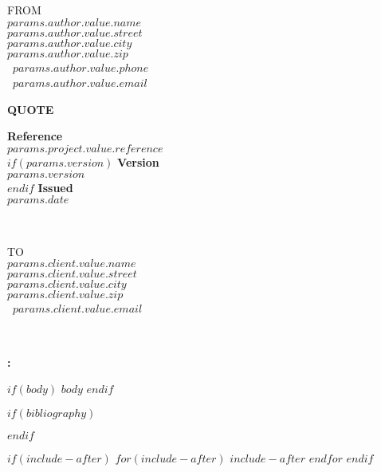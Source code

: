 \documentclass[
11pt,
a4paper,
twoside,
]{article}
\begin{document}
\vspace{0pt}
\begin{minipage}[t]{0.5\textwidth}
  \vspace{0pt}
  \begin{flushleft}
    \uppercase{From}                      \\
    \textbf{$params.author.value.name$}   \\
    $params.author.value.street$          \\
    $params.author.value.city$            \\
    $params.author.value.zip$             \\
    \faPhone\ $params.author.value.phone$ \\
    \faEnvelopeO\ $params.author.value.email$
  \end{flushleft}
\end{minipage}
\hfill
\begin{minipage}[t]{0.5\textwidth}
  \vspace{0pt}
  \begin{flushright}
    {\LARGE\bfseries\uppercase{Quote}}

    {\bfseries Reference}               \\
    $params.project.value.reference$ \\
    $if(params.version)$
    {\bfseries Version}                 \\
    $params.version$              \\
    $endif$
    {\bfseries Issued}                    \\
    $params.date$
  \end{flushright}
\end{minipage}\\[\baselineskip]
\begin{minipage}{1\textwidth}
  \begin{flushleft}
    \uppercase{To}\\
    \textbf{$params.client.value.name$}\\
    $params.client.value.street$\\
    $params.client.value.city$\\
    $params.client.value.zip$\\
    \faEnvelopeO\ $params.client.value.email$
  \end{flushleft}
\end{minipage}\\

\begin{center}
  {\large\bfseries{}:}\\
  {\itshape{}}
\end{center}

$if(body)$
$body$
$endif$

$if(bibliography)$
\clearpage

$endif$

$if(include-after)$
\clearpage
$for(include-after)$
$include-after$
$endfor$
$endif$
\end{document}
